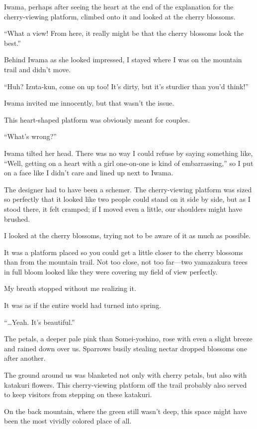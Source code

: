 \documentclass[
    a4paper,
    12pt,
    twoside,
    openany,
    UTF8,
    fontset=windows
]{ctexbook}
\begin{document}
Iwama, perhaps after seeing the heart at the end of the explanation for the cherry-viewing platform, climbed onto it and looked at the cherry blossoms.

``What a view! From here, it really might be that the cherry blossoms look the best.''

Behind Iwama as she looked impressed, I stayed where I was on the mountain trail and didn't move.

``Huh? Izuta-kun, come on up too! It's dirty, but it's sturdier than you'd think!''

Iwama invited me innocently, but that wasn't the issue.

This heart-shaped platform was obviously meant for couples.

``What's wrong?''

Iwama tilted her head. There was no way I could refuse by saying something like, ``Well, getting on a heart with a girl one-on-one is kind of embarrassing,'' so I put on a face like I didn't care and lined up next to Iwama.

The designer had to have been a schemer. The cherry-viewing platform was sized so perfectly that it looked like two people could stand on it side by side, but as I stood there, it felt cramped; if I moved even a little, our shoulders might have brushed.

I looked at the cherry blossoms, trying not to be aware of it as much as possible.

It was a platform placed so you could get a little closer to the cherry blossoms than from the mountain trail. Not too close, not too far---two yamazakura trees in full bloom looked like they were covering my field of view perfectly.

My breath stopped without me realizing it.

It was as if the entire world had turned into spring.

``\dots Yeah. It's beautiful.''

The petals, a deeper pale pink than Somei-yoshino, rose with even a slight breeze and rained down over us. Sparrows busily stealing nectar dropped blossoms one after another.

The ground around us was blanketed not only with cherry petals, but also with katakuri flowers. This cherry-viewing platform off the trail probably also served to keep visitors from stepping on these katakuri.

On the back mountain, where the green still wasn't deep, this space might have been the most vividly colored place of all.
\end{document}
